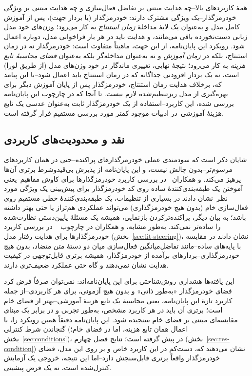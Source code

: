 همهٔ کاربردهای بالا--چه هدایت مبتنی بر تفاضل فعال‌سازی و چه هدایت مبتنی بر ویژگی خودرمزگذار--یک ویژگی مشترک دارند: خودرمزگذار (یا بردار جهت)، پس از آموزش کامل مدل و به‌عنوان یک لایهٔ مداخلهٔ \emph{زمان استنتاج} به کار می‌رود؛ وزن‌های خود مدل زبانی دست‌نخورده باقی می‌مانند، و هدایت باید در هر بار فراخوانی مدل، دوباره اعمال شود. رویکرد این پایان‌نامه، از این جهت، ماهیتاً متفاوت است: خودرمزگذار نه در زمان استنتاج، بلکه در \emph{زمان آموزش} و نه به‌عنوان مداخله‌گر بلکه به‌عنوان \emph{فضای محاسبهٔ تابع هزینه} به کار می‌رود؛ نتیجهٔ نهایی، تغییری ماندگار در خود وزن‌های مدل (از طریق لورا) است، نه یک بردار افزودنی جداگانه که در زمان استنتاج باید اعمال شود--با این پیامد که، برخلاف هدایت زمان استنتاج، خودرمزگذار پس از پایان آموزش دیگر برای بهره‌گیری از مدل ریزتنظیم‌شده لازم نیست. تا آنجا که در چارچوب این پایان‌نامه بررسی شده، این کاربرد--استفاده از یک خودرمزگذار ثابت به‌عنوان عدسی یک تابع هزینهٔ آموزشی--در ادبیات موجود کمتر مورد بررسی مستقیم قرار گرفته است.

\subsection{نقد و محدودیت‌های کاربردی}
شایان ذکر است که سودمندی عملی خودرمزگذارهای پراکنده--حتی در همان کاربردهای مرسوم‌تر--بدون چالش نیست، و این پایان‌نامه از پذیرش بی‌قیدوشرط برتری آن‌ها پرهیز می‌کند.
و همکاران~\cite{kantamneni2025useful}
در بررسی کاربرد خودرمزگذارها برای کاوش
مفاهیم--یعنی آموختن یک طبقه‌بندی‌کنندهٔ ساده روی کد خودرمزگذار برای پیش‌بینی یک ویژگی مورد نظر--نشان دادند در بسیاری از تنظیمات، یک طبقه‌بندی‌کنندهٔ خطی مستقیم روی فعال‌سازی خام (بدون هیچ خودرمزگذاری) می‌تواند عملکردی هم‌تراز یا حتی بهتر داشته باشد؛ به بیان دیگر، پراکنده‌ترکردن بازنمایی، همیشه یک مسئلهٔ پایین‌دستی نظارت‌شده را ساده‌تر نمی‌کند. به‌طور مشابه،
و همکاران در چارچوب
~\cite{wu2025axbench}
در بررسی کاربرد خودرمزگذارها برای هدایت رفتار مدل (بخش~\ref{sec:lit-steering})، نشان دادند در مقایسه با پایه‌های ساده--مانند تفاضل‌میانگین فعال‌سازی میان دو دستهٔ متن متضاد، بدون هیچ خودرمزگذاری--بردارهای برآمده از خودرمزگذار، همیشه برتری قابل‌توجهی در کیفیت هدایت نشان نمی‌دهند و گاه حتی عملکرد ضعیف‌تری دارند.

این یافته‌ها هشداری روش‌شناختی برای این پایان‌نامه‌اند: نمی‌توان صرفاً فرض کرد فضای خودرمزگذار «به‌طور ذاتی» و بدون هیچ آزمونی، برای هر کاربردی--از جمله کاربرد تازهٔ این پایان‌نامه، یعنی محاسبهٔ یک تابع هزینهٔ آموزشی--بهتر از فضای خام است؛ برتری آن باید در هر کاربرد مشخص، به‌طور تجربی و در برابر یک مبنای مقایسه‌ای مبتنی بر فضای خام سنجیده شود. این پایان‌نامه دقیقاً همین رویکرد را، با گنجاندن شرط کنترلی
 (اعمال همان تابع هزینه، اما در فضای خام؛ بخش~\ref{sec:conditions})، در پیش گرفته است؛ نتایج فصل چهارم (بخش~\ref{sec:res-condition}) نشان می‌دهند که، دست‌کم در این کاربرد خاص و بر روی این مدل، فضای خودرمزگذار واقعاً برتری قابل‌سنجش دارد--اما این نتیجه، خروجی یک آزمایش کنترل‌شده است، نه یک فرض پیشینی.

